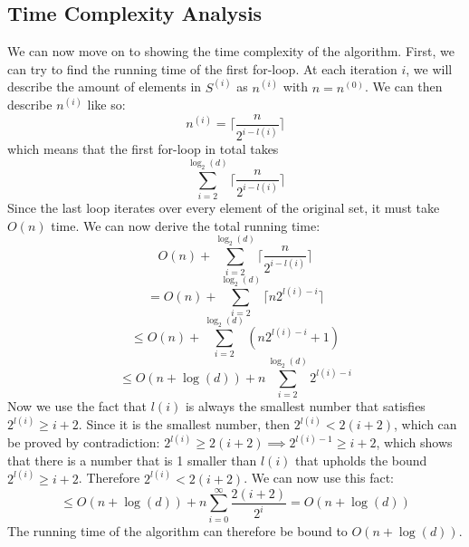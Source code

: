 \subsection{Time Complexity Analysis}
We can now move on to showing the time complexity of the algorithm. 
First, we can try to find the running time of the first for-loop. At each iteration $i$, we will describe the amount of elements in $S^{(i)}$ as $n^{(i)}$ with $n=n^{(0)}$. We can then describe $n^{(i)}$ like so:
\begin{equation}
    n^{(i)}=\lceil \frac{n}{2^{i-l(i)}} \rceil
\end{equation}
which means that the first for-loop in total takes
$$\sum_{i=2}^{\log_2(d)}\lceil \frac{n}{2^{i-l(i)}} \rceil$$
Since the last loop iterates over every element of the original set, it must take $O(n)$ time. We can now derive the total running time:
$$O(n) + \sum_{i=2}^{\log_2(d)}\lceil \frac{n}{2^{i-l(i)}} \rceil$$
$$=O(n) + \sum_{i=2}^{\log_2(d)}\lceil n2^{l(i)-i} \rceil$$
$$\leq O(n) + \sum_{i=2}^{\log_2(d)}(n2^{l(i)-i} + 1)$$
$$\leq O(n + \log(d)) + n\sum_{i=2}^{\log_2(d)}2^{l(i)-i}$$
Now we use the fact that $l(i)$ is always the smallest number that satisfies $2^{l(i)} \geq i + 2$. Since it is the smallest number, then $2^{l(i)} < 2(i+2)$, which can be proved by contradiction: $2^{l(i)} \geq 2(i+2) \implies 2^{l(i)-1} \geq i+2$, which shows that there is a number that is 1 smaller than $l(i)$ that upholds the bound $2^{l(i)} \geq i + 2$. Therefore $2^{l(i)} < 2(i+2)$. We can now use this fact:
$$\leq O(n + \log(d)) + n\sum_{i=0}^{\infty}\frac{2(i+2)}{2^{i}} = O(n+\log(d))$$
The running time of the algorithm can therefore be bound to $O(n + \log(d))$.
